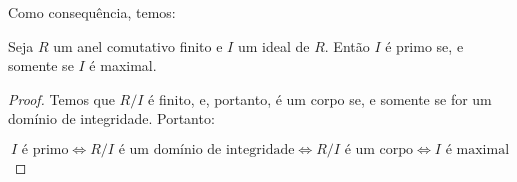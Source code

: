 Como consequência, temos:

\begin{corol}
    Seja $R$ um anel comutativo finito e $I$ um ideal de $R$. Então $I$ é primo se, e somente se $I$ é maximal.
\end{corol}
\begin{proof}
    Temos que $R/I$ é finito, e, portanto, é um corpo se, e somente se for um domínio de integridade.
    Portanto:

    \[I \text{ é primo} \Leftrightarrow R/I \text{ é um domínio de integridade} \Leftrightarrow R/I \text{ é um corpo} \Leftrightarrow I \text{ é maximal}\]
\end{proof}